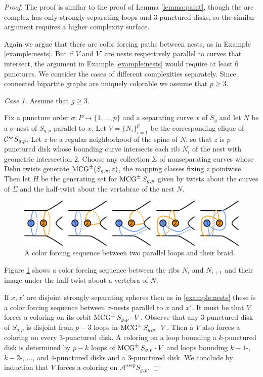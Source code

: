 \begin{proof}
The proof is similar to the proof of Lemma \ref{lemma:paint},
though the arc complex has only strongly separating loops and 3-punctured disks,
so the similar argument requires a higher complexity surface.

Again we argue that there are color forcing paths between nests,  as in Example \ref{example:nests}.
But if $V$ and $V'$ are nests respectively parallel to curves that intersect, the argument
in Example \ref{example:nests} would require at least 6 punctures.
We consider the cases of different complexities separately.
Since connected bipartite graphs are uniquely colorable we assume that $p\geq 3$.

\emph{Case 1.} Assume that $g \geq 3$.

Fix a puncture order $\sigma: P \to \{1, \ldots, p\}$ and a separating curve $x$ of $S_g$
and let $N$ be a $\sigma$-nest of $S_{g,p}$ parallel to $x$.
Let $V=\{N_i\}_{i =1}^p$ be the corresponding clique of $ \mathcal C^{{ss}}  S_{g,p}$.
Let $z$ be a regular neighborhood of the spine of $N$, so that $z$ is $p$-punctured disk
whose bounding curve intersects each rib $N_i$ of the nest with geometric intersection 2.
Choose any collection $\Sigma$ of nonseparating curves whose Dehn twists generate
$\operatorname{MCG}^\pm (S_{g,p},z)$,
the mapping classes fixing $z$ pointwise.
Then let $H$ be the generating set for $\operatorname{MCG}^\pm S_{g,p}$
given by twists about the curves of $\Sigma$
and the half-twist about the vertabrae of the nest $N$.

\begin{figure}[h!]
  \centering
  \includegraphics[width=\textwidth]{figures/strongbraid1.pdf}
  \caption{A color forcing sequence between two parallel loops and their braid.}
  \label{fig:strongbraid1}
\end{figure}

Figure \ref{fig:strongbraid1} shows a color forcing sequence between
the ribs $N_i$ and $N_{i+1}$ and their image under the half-twist about a vertebra of $N$.

If $x,x'$ are disjoint strongly separating spheres then as in \ref{example:nests}
these is a color forcing sequence between $\sigma$-nests parallel to $x$ and $x'$.
It must be that $V$ forces a coloring on its orbit $\operatorname{MCG}^{\pm} S_{g,p} \cdot V$.
Observe that any 3-punctured disk of $S_{g,p}$ is disjoint from $p-3$
loops in $\operatorname{MCG}^{\pm} S_{g,p} \cdot V$.
Then a $V$ also forces a coloring on every 3-punctured disk.
A coloring on a loop bounding a $k$-punctured disk
is determined by $p-k$ loops of $\operatorname{MCG}^{\pm} S_{g,p} \cdot V$
and loops bounding $k-1$-, $k-2$-, $\ldots$, and $4$-punctured disks and a 3-punctured disk.
We conclude by induction that $V$ forces a coloring on $\mathcal A^{ssep} S_{g,p}$.



\end{proof}
